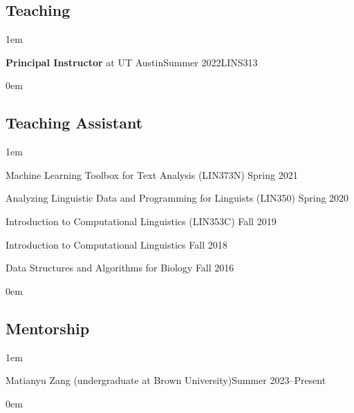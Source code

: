 \subsection{Teaching}
\leftskip1em\relax

  {\textbf{Principal Instructor} at UT Austin}{Summer 2022}{LINS313}{}

\leftskip0em\relax
  
\subsection{Teaching Assistant}
\leftskip1em\relax
\vspace{0.6\baselineskip}

\textbullet\enspace Machine Learning Toolbox for Text Analysis ({\rmsc LIN373N}) \hfill Spring 2021

\textbullet\enspace Analyzing Linguistic Data and Programming for Linguists ({\rmsc LIN350}) \hfill Spring 2020

\textbullet\enspace Introduction to Computational Linguistics ({\rmsc LIN353C}) \hfill Fall 2019

\textbullet\enspace Introduction to Computational Linguistics \hfill Fall 2018

\textbullet\enspace Data Structures and Algorithms for Biology \hfill Fall 2016

\leftskip0em\relax

\subsection{Mentorship}
\leftskip1em\relax

  {\normalsize Matianyu Zang (undergraduate at Brown University)}{\normalsize Summer 2023--Present}{}{}

\leftskip0em\relax
